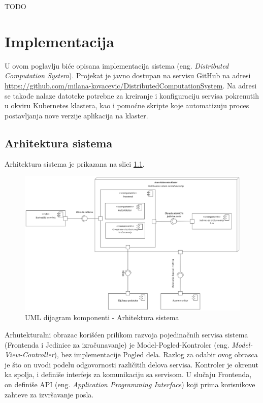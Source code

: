 \documentclass[12pt,oneside]{memoir}
\begin{document}
TODO

\chapter{Implementacija}
\label{chp:impl}

U ovom poglavlju biće opisana implementacija sistema (eng. \emph{Distributed Computation System}).
Projekat je javno dostupan na servisu GitHub na adresi \href{https://github.com/milana-kovacevic/DistributedComputationSystem}{https://github.com/milana-kovacevic/DistributedComputationSystem}. Na adresi se takođe nalaze datoteke potrebne za kreiranje i konfiguraciju servisa pokrenutih u okviru Kubernetes klastera, kao i pomoćne skripte koje automatizuju proces postavljanja nove verzije aplikacija na klaster.


\section{Arhitektura sistema}

Arhitektura sistema je prikazana na slici \ref{fig:arhitektura}.

\begin{figure}[!ht]
  \centering
  \label{fig:arhitektura}
  \includegraphics[width=1.0\textwidth]{./images/arhitektura_sistema_dijagram_komponenti.png}
  \caption{UML dijagram komponenti - Arhitektura sistema}
\end{figure}

Arhutekturalni obrazac korišćen prilikom razvoja pojedinačnih servisa sistema (Frontenda i Jedinice za izračunavanje) je Model-Pogled-Kontroler (eng. \emph{Model-View-Controller}), bez implementacije Pogled dela. Razlog za odabir ovog obrasca je što on uvodi podelu odgovornosti različitih delova servisa. Kontroler je okrenut ka spolja, i definiše interfejs za komunikaciju sa servisom. U slučaju Frontenda, on definiše API (eng. \emph{Application Programming Interface}) koji prima korisnikove zahteve za izvršavanje posla.
\end{document}
